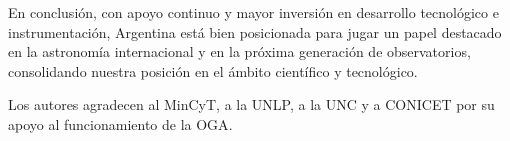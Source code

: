 \documentclass[baaa]{baaa}
\begin{document}
En conclusión, con apoyo continuo y mayor inversión en desarrollo tecnológico e instrumentación, Argentina está bien posicionada para jugar un papel destacado en la astronomía internacional y en la próxima generación de observatorios, consolidando nuestra posición en el ámbito científico y tecnológico.


\begin{acknowledgement}
{Los autores agradecen al MinCyT, a la UNLP, a la UNC y a CONICET por su apoyo al funcionamiento de la OGA}.
\end{acknowledgement}



%
%
 
\end{document}
